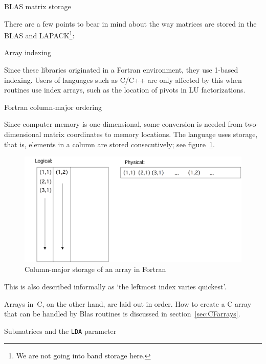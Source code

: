  {BLAS matrix storage}

There are a few points to bear in mind about the way matrices are
stored in the BLAS and LAPACK\footnote{We are not going into band
  storage here.}:

 {Array indexing}

Since these libraries originated in a Fortran environment, they
  use 1-based indexing. Users of languages such as C/C++ are only
  affected by this when routines use index arrays, such as the
  location of pivots in LU factorizations.

 {Fortran column-major ordering}

Since computer memory is one-dimensional, some conversion is needed
from two-dimensional matrix coordinates to memory locations. The
 language uses  storage, that is,
elements in a column are stored consecutively; see
figure~\ref{fig:densearray}.
\begin{figure}
  \includegraphics[scale=.14]{graphics/densearray}
  \caption{Column-major storage of an array in Fortran}
  \label{fig:densearray}
\end{figure}
This is also described informally as `the leftmost index varies
quickest'.

Arrays in~C, on the other hand, are laid out in  order.
How to create a C array that can be handled by Blas routines
is discussed in section~\ref{sec:CFarrays}.

 {Submatrices and the {\tt LDA} parameter}

